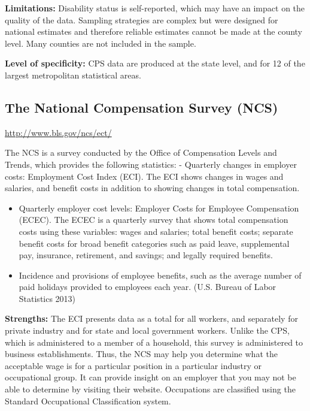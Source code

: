 \documentclass[]{book}
\theoremstyle{definition}
\theoremstyle{definition}
\theoremstyle{definition}
\theoremstyle{remark}
\begin{document}
\textbf{Limitations:} Disability status is self-reported, which may have
an impact on the quality of the data. Sampling strategies are complex
but were designed for national estimates and therefore reliable
estimates cannot be made at the county level. Many counties are not
included in the sample.

\textbf{Level of specificity:} CPS data are produced at the state level,
and for 12 of the largest metropolitan statistical areas.

\subsection{The National Compensation Survey
(NCS)}\label{the-national-compensation-survey-ncs}

\url{http://www.bls.gov/ncs/ect/}

The NCS is a survey conducted by the Office of Compensation Levels and
Trends, which provides the following statistics: - Quarterly changes in
employer costs: Employment Cost Index (ECI). The ECI shows changes in
wages and salaries, and benefit costs in addition to showing changes in
total compensation.

\begin{itemize}
\item
  Quarterly employer cost levels: Employer Costs for Employee
  Compensation (ECEC). The ECEC is a quarterly survey that shows total
  compensation costs using these variables: wages and salaries; total
  benefit costs; separate benefit costs for broad benefit categories
  such as paid leave, supplemental pay, insurance, retirement, and
  savings; and legally required benefits.
\item
  Incidence and provisions of employee benefits, such as the average
  number of paid holidays provided to employees each year. (U.S. Bureau
  of Labor Statistics 2013)
\end{itemize}

\textbf{Strengths:} The ECI presents data as a total for all workers,
and separately for private industry and for state and local government
workers. Unlike the CPS, which is administered to a member of a
household, this survey is administered to business establishments. Thus,
the NCS may help you determine what the acceptable wage is for a
particular position in a particular industry or occupational group. It
can provide insight on an employer that you may not be able to determine
by visiting their website. Occupations are classified using the Standard
Occupational Classification system.
\end{document}

